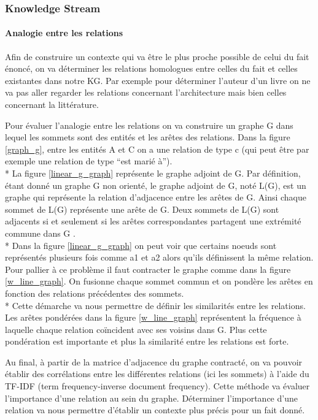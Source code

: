 \subsubsection{Knowledge Stream}
\label{sec:ks}

\paragraph{Analogie entre les relations}

Afin de construire un contexte qui va être le plus proche possible de celui du fait énoncé, on va déterminer les relations homologues entre celles du fait et celles existantes dans notre KG. Par exemple pour déterminer l'auteur d'un livre on ne va pas aller regarder les relations concernant l'architecture mais bien celles concernant la littérature.

Pour évaluer l'analogie entre les relations on va construire un graphe G dans lequel les sommets sont des entités et les arêtes des relations. Dans la figure \ref{graph_g},  entre les entités A et C on a une relation de type c (qui peut être par exemple une relation de type \enquote{est marié à}).
\\*
La figure \ref{linear_g_graph} représente le graphe adjoint de G. Par définition, étant donné un graphe G non orienté, le graphe adjoint de G, noté L(G), est un graphe qui représente la relation d'adjacence entre les arêtes de G. Ainsi chaque sommet de L(G) représente une arête de G. Deux sommets de L(G) sont adjacents si et seulement si les arêtes correspondantes partagent une extrémité commune dans G \cite{wiki:lg}.
\\* 
Dans la figure \ref{linear_g_graph} on peut voir que certains noeuds sont représentés plusieurs fois comme a1 et a2 alors qu'ils définissent la même relation. Pour pallier à ce problème il faut contracter le graphe comme dans la figure \ref{w_line_graph}. On fusionne chaque sommet commun et on pondère les arêtes en fonction des relations précédentes des sommets.
\\*
Cette démarche va nous permettre de définir les similarités entre les relations. Les arêtes pondérées dans la figure \ref{w_line_graph} représentent la fréquence à laquelle chaque relation coïncident avec ses voisins dans G. Plus cette pondération est importante et plus la similarité entre les relations est forte.

Au final, à partir de la matrice d'adjacence du graphe contracté, on va pouvoir établir des corrélations entre les différentes relations (ici les sommets) à l'aide du TF-IDF (term frequency-inverse document frequency). Cette méthode va évaluer l'importance d'une relation au sein du graphe. Déterminer l'importance d'une relation va nous permettre d'établir un contexte plus précis pour un fait donné. 


